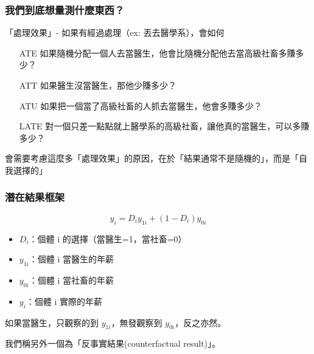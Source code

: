 \begin{frame}
    \frametitle{我們到底想量測什麼東西？}

    「處理效果」- 如果有經過處理（ex: 丟去醫學系），會如何
    \begin{enumerate}[<+->]
        \item[ATE] 如果隨機分配一個人去當醫生，他會比隨機分配他去當高級社畜多賺多少？
        \item[ATT] 如果醫生沒當醫生，那他少賺多少？
        \item[ATU] 如果把一個當了高級社畜的人抓去當醫生，他會多賺多少？
        \item[LATE] 對一個只差一點點就上醫學系的高級社畜，讓他真的當醫生，可以多賺多少？
    \end{enumerate}
    \pause
    會需要考慮這麼多「處理效果」的原因，在於「結果通常不是隨機的」，而是「自我選擇的」
\end{frame}

\begin{frame}
    \frametitle{潛在結果框架}
    \begin{equation}
        y_i = D_i y_{1i} + (1-D_i) y_{0i}
    \end{equation}
    \pause
    \begin{itemize}
        \item $D_i$：個體 i 的選擇（當醫生=1，當社畜=0）
        \item $y_{1i}$：個體 i 當醫生的年薪
        \item $y_{0i}$：個體 i 當社畜的年薪
        \item $y_{i}$：個體 i 實際的年薪
    \end{itemize}
    \pause
    如果當醫生，只觀察的到 $y_{1i}$，無發觀察到 $y_{0i}$，反之亦然。
    
    我們稱另外一個為「反事實結果(counterfactual result)」。

\end{frame}

